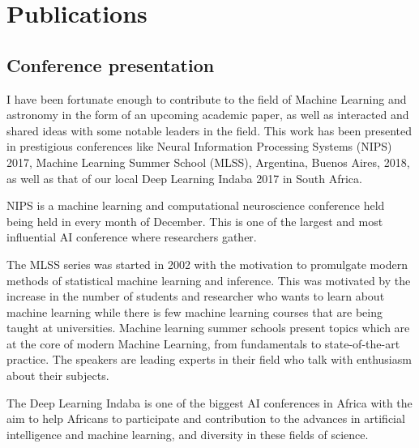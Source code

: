 \chapter*{Publications}

\section*{Conference presentation}

I have been fortunate enough to contribute to the field of Machine Learning and astronomy in the form of an
upcoming academic paper, as well as interacted and shared ideas with some notable leaders in the field. This work has been presented in prestigious conferences like Neural Information Processing Systems (NIPS) 2017, Machine Learning Summer School (MLSS), Argentina, Buenos Aires, 2018, as well as that of our local Deep Learning Indaba 2017 in South Africa.

NIPS is a machine learning and computational neuroscience conference held being held in every month of December. This is one of the largest and most influential AI conference where researchers gather. 

The MLSS series was started in 2002 with the motivation to
promulgate modern methods of statistical machine learning and inference. This was motivated by the increase in the number of students and researcher who wants to learn about machine learning while there is few machine learning courses that are being taught at universities.
Machine learning summer schools present topics which are at the core of modern Machine Learning, from fundamentals to state-of-the-art practice. The speakers are leading experts in their field who talk with enthusiasm about their subjects.

The Deep Learning Indaba is one of the biggest AI conferences in Africa with the aim to help Africans to participate and contribution to the advances in artificial intelligence and machine learning, and diversity in these fields of science. 
 